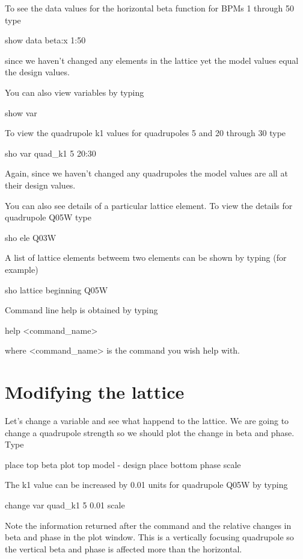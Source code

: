 \documentclass{report}
\begin{document}
To see the data values for the horizontal beta function for \cesr BPMs 1 through
50 type
\begin{example}
  show data beta:x 1:50
\end{example}
since we haven't changed any elements in the lattice yet the model values equal
the design values.

You can also view variables by typing
\begin{example}
  show var
\end{example}
To view the quadrupole k1 values for \cesr quadrupoles 5  and 20 through 30 type
\begin{example}
  sho var quad\_k1 5 20:30
\end{example}
Again, since we haven't changed any quadrupoles the model values are all at their
design values.

You can also see details of a particular lattice element. To view the details
for quadrupole Q05W type
\begin{example}
  sho ele Q03W
\end{example}

A list of lattice elements betweem two elements can be shown by typing (for
example)
\begin{example}
  sho lattice beginning Q05W
\end{example}

Command line help is obtained by typing
\begin{example}
  help <command\_name>
\end{example}
where <command\_name> is the command you wish help with.

\chapter{Modifying the lattice}
\label{c:modify_lattice}

Let's change a variable and see what happend to the lattice. We are going to
change a quadrupole strength so we should plot the change in beta and phase.
Type
\begin{example}
  place top beta
  plot top model - design
  place bottom phase
  scale
\end{example}

The k1 value can be increased by 0.01 units for quadrupole Q05W by typing
\begin{example}
  change var quad\_k1 5 0.01
  scale
\end{example}
Note the information returned after the command and the relative changes in
beta and phase in the plot window. This is a vertically focusing quadrupole so
the vertical beta and phase is affected more than the horizontal.
\end{document}
